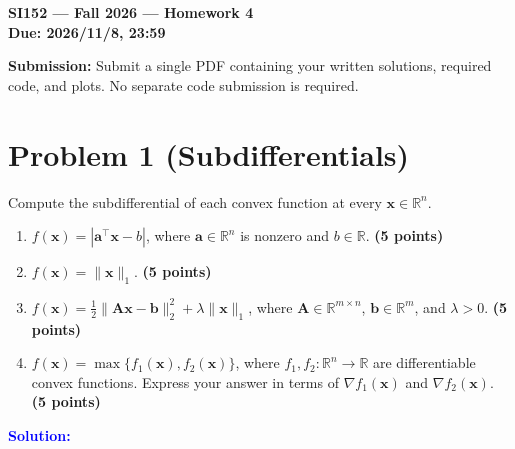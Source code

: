 \documentclass[11pt,a4paper]{article}
\newcommand{\solution}{\par\medskip
    \textcolor{blue}{\textbf{Solution:}}\par\smallskip}
\begin{document}
\begin{center}
    {\Large\bfseries SI152 --- Fall 2026 --- Homework 4}\\[0.6em]
    \textbf{Due: 2026/11/8, 23:59}
\end{center}

\textbf{Submission:} Submit a single PDF containing your written
solutions, required code, and plots.
No separate code submission is required.

\section*{Problem 1 (Subdifferentials)}

Compute the subdifferential of each convex function at every
$\mathbf{x}\in\mathbb{R}^n$.

\begin{enumerate}
    \item
    $f(\mathbf{x})=|\mathbf{a}^\top\mathbf{x}-b|$,
    where $\mathbf{a}\in\mathbb{R}^n$ is nonzero and $b\in\mathbb{R}$.
    \textbf{(5 points)}

    \item
    $f(\mathbf{x})=\|\mathbf{x}\|_1$.
    \textbf{(5 points)}

    \item
    $f(\mathbf{x})=\frac12\|\mathbf{A}\mathbf{x}-\mathbf{b}\|_2^2
    +\lambda\|\mathbf{x}\|_1$,
    where $\mathbf{A}\in\mathbb{R}^{m\times n}$,
    $\mathbf{b}\in\mathbb{R}^m$, and $\lambda>0$.
    \textbf{(5 points)}

    \item
    $f(\mathbf{x})=\max\{f_1(\mathbf{x}),f_2(\mathbf{x})\}$,
    where $f_1,f_2:\mathbb{R}^n\to\mathbb{R}$ are
    differentiable convex functions.
    Express your answer in terms of
    $\nabla f_1(\mathbf{x})$ and $\nabla f_2(\mathbf{x})$.
    \textbf{(5 points)}
\end{enumerate}

\solution
\end{document}
